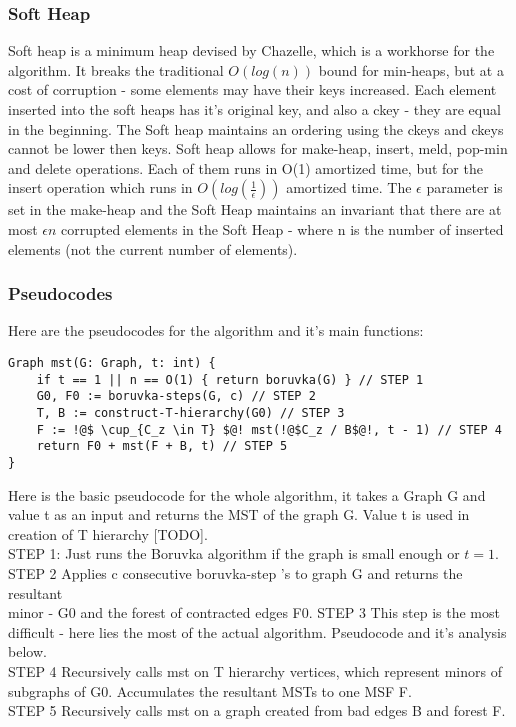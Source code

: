 \documentclass{article}
\begin{document}
\subsubsection{Soft Heap}
Soft heap is a minimum heap devised by Chazelle, which is a workhorse for the algorithm. It breaks the traditional $O(log(n))$ bound for min-heaps, but at a cost of corruption - some elements may have their keys increased. Each element inserted into the soft heaps has it's original key, and also a ckey - they are equal in the beginning. The Soft heap maintains an ordering using the ckeys and ckeys cannot be lower then keys. Soft heap allows for make-heap, insert, meld, pop-min and delete operations. Each of them runs in O(1) amortized time, but for the insert operation which runs in $O(log (\frac{1}{\epsilon}))$ amortized time. The $\epsilon$ parameter is set in the make-heap and the Soft Heap maintains an invariant that there are at most $\epsilon n$ corrupted elements in the Soft Heap - where n is the number of inserted elements (not the current number of elements).  

\subsubsection{Pseudocodes}
Here are the pseudocodes for the algorithm and it's main functions:
\begin{lstlisting}
Graph mst(G: Graph, t: int) {
    if t == 1 || n == O(1) { return boruvka(G) } // STEP 1
    G0, F0 := boruvka-steps(G, c) // STEP 2
    T, B := construct-T-hierarchy(G0) // STEP 3
    F := !@$ \cup_{C_z \in T} $@! mst(!@$C_z / B$@!, t - 1) // STEP 4
    return F0 + mst(F + B, t) // STEP 5
}
\end{lstlisting}
Here is the basic pseudocode for the whole algorithm, it takes a Graph G and value t as an input and returns the MST of the graph G. Value t is used in creation of T hierarchy [TODO]. \\
STEP 1: Just runs the Boruvka algorithm if the graph is small enough or $t = 1$. \\
STEP 2 Applies c consecutive boruvka-step 's to graph G and returns the resultant \\minor - G0 and the forest of contracted edges F0.  
STEP 3 This step is the most difficult - here lies the most of the actual algorithm. Pseudocode and it's analysis below. \\
STEP 4 Recursively calls mst on T hierarchy vertices, which represent minors of subgraphs of G0.  Accumulates the resultant MSTs to one MSF F. \\
STEP 5 Recursively calls mst on a graph created from bad edges B and forest F. \\
\end{document}
